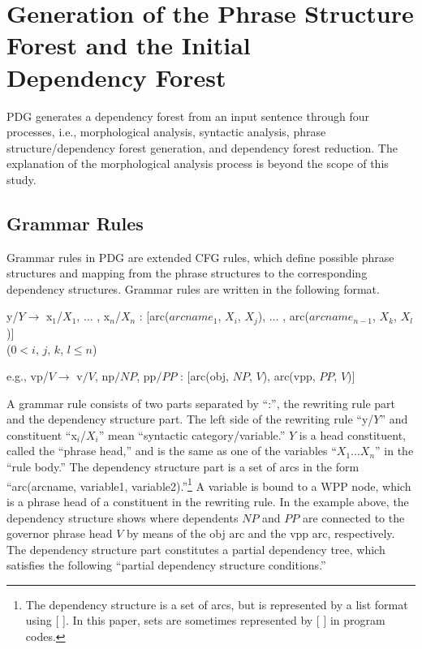 \documentclass[english]{jnlp_1.4_rep}
\theoremstyle{break}
\theoremstyle{plain}
\theoremstyle{plain}
\begin{document}
\clearpage
\section{Generation of the Phrase Structure Forest and the Initial \\\hspace{19pt}Dependency Forest}
\label{sec:construction}

PDG generates a dependency forest from an input sentence through four
processes, i.e., 
\linebreak
morphological analysis, syntactic analysis, phrase
structure/dependency forest generation, and dependency forest
reduction. The explanation of the morphological analysis process is
beyond the scope of this study.


\subsection{Grammar Rules}
\label{sec:bunpoukisoku}

Grammar rules in PDG are extended CFG rules, which define possible
phrase structures and mapping from the phrase structures to the
corresponding dependency structures. Grammar rules are written in the
following format.

y/$Y \rightarrow$ x$_1$/$X_1$, $\ldots$ , x$_n$/$X_n$ : [arc($arcname_1$, $X_i$, $X_j$), $\ldots$ , arc($arcname_{n-1}$, $X_k$, $X_l$)] \\
\quad (0$<i$, $j$, $k$, $l{\leq}n$)

e.g., vp/$V \rightarrow$ v$/V$, np$/NP$, pp$/PP$ : [arc(obj, $NP$, $V$), arc(vpp, $PP$, $V$)]

\noindent
A grammar rule consists of two parts separated by ``:'',
the rewriting rule part and the dependency structure part. The left
side of the rewriting rule ``y/$Y$'' and constituent ``x$_i$/$X_i$''
mean ``syntactic category/variable.'' $Y$ is a head constituent,
called the ``phrase head,'' and is the same as one of the variables
``$X_1 {\ldots} X_n$'' in the ``rule body.'' The dependency structure
part is a set of arcs in the form ``arc(arcname, variable1,
variable2).''\footnote{The dependency structure is a set of arcs, but
is represented by a list format using [ ]. In this paper, sets are
sometimes represented by [ ] in program codes.} A variable is bound
to a WPP node, which is a phrase head of a constituent in the
rewriting rule. In the example above, the dependency structure shows where
dependents $NP$ and $PP$ are connected to the governor phrase head $V$
by means of the obj arc and the vpp arc, respectively. The dependency
structure part constitutes a partial dependency tree, which satisfies
the following ``partial dependency structure conditions.''
\end{document}
